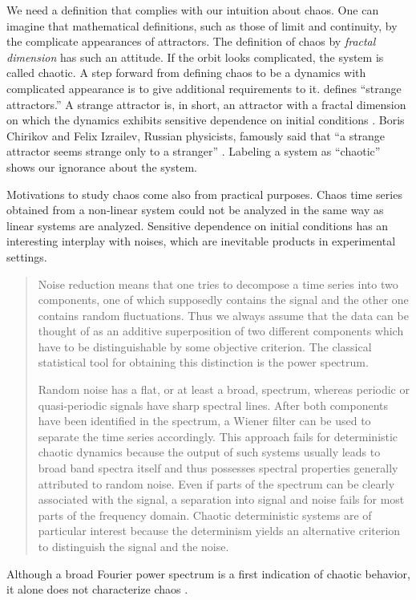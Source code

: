 \documentclass[10pt,twoside,draft]{book}
\begin{document}
We need a definition that complies with our intuition about chaos.
One can imagine that mathematical definitions, such as those of limit and continuity,
by the complicate appearances of attractors.
The definition of chaos by \textit{fractal dimension} has such an attitude.
If the orbit looks complicated, the system is called chaotic.
A step forward from defining chaos to be a dynamics with complicated appearance is to give additional requirements to it.
\citet{ruelle} defines ``strange attractors.'' 
A strange attractor is, in short, an attractor with a fractal dimension on which the dynamics exhibits sensitive dependence on initial conditions \citep[p.11]{ott1994}.
Boris Chirikov and Felix Izrailev, Russian physicists, famously said that ``a strange attractor seems strange only to a stranger'' \citep{lorentzbook}.
Labeling a system as ``chaotic'' shows our ignorance about the system.


Motivations to study chaos come also from practical purposes.
Chaos time series obtained from a non-linear system could not be analyzed in the same way as linear systems are analyzed.
Sensitive dependence on initial conditions has an interesting interplay with noises, which are inevitable products in experimental settings.
\citet[p.51]{kantz-schreiber}
\begin{quotation}
  Noise reduction means that one tries to decompose a time series into two components, one of which supposedly contains the signal and the other one contains random fluctuations.
  Thus we always assume that the data can be thought of as an additive superposition of two different components which have to be distinguishable by some objective criterion.
  The classical statistical tool for obtaining this distinction is the power spectrum.

  Random noise has a flat, or at least a broad, spectrum, whereas periodic or quasi-periodic signals have sharp spectral lines.
  After both components have been identified in the spectrum, a Wiener filter can be used to separate the time series accordingly.
  This approach fails for deterministic chaotic dynamics because the output of such systems usually leads to broad band spectra itself and thus possesses spectral properties generally attributed to random noise.
  Even if parts of the spectrum can be clearly associated with the signal, a separation into signal and noise fails for most parts of the frequency domain.
  Chaotic deterministic systems are of particular interest because the determinism yields an alternative criterion to distinguish the signal and the noise. 
\end{quotation}
Although a broad Fourier power spectrum is a first indication of chaotic behavior, it alone does not characterize chaos \citep{abarbanel}.
\end{document}
